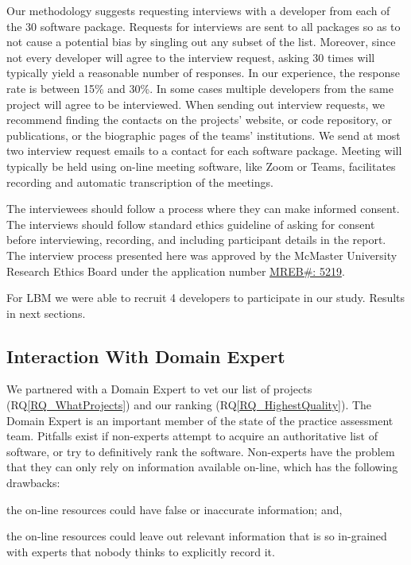 \documentclass[runningheads]{llncs}
\newcommand{\rqref}[1]{RQ\ref{#1}}
\begin{document}
Our methodology suggests requesting interviews with a developer from each of the
30 software package.  Requests for interviews are sent to all packages so as to
not cause a potential bias by singling out any subset of the list. Moreover,
since not every developer will agree to the interview request, asking 30 times
will typically yield a reasonable number of responses. In our experience, the
response rate is between 15\% and 30\%.  In some cases multiple developers from
the same project will agree to be interviewed. When sending out interview
requests, we recommend finding the contacts on the projects’ website, or code
repository, or publications, or the biographic pages of the teams’ institutions.
We send at most two interview request emails to a contact for each software
package.  Meeting will typically be held using on-line meeting software, like
Zoom or Teams, facilitates recording and automatic transcription of the
meetings.

The interviewees should follow a process where they can make informed consent.
The interviews should follow standard ethics guideline of asking for consent
before interviewing, recording, and including participant details in the report.
The interview process presented here was approved by the McMaster University
Research Ethics Board under the application number 
\href{https://github.com/smiths/AIMSS/blob/master/StateOfPractice/MACREM/Application.pdf}
{MREB\#: 5219}.

For LBM we were able to recruit 4 developers to participate in our study.
Results in next sections.

\subsection{Interaction With Domain Expert} \label{sec_vet_software_list}

We partnered with a Domain Expert to vet our list of projects
(\rqref{RQ_WhatProjects}) and our ranking (\rqref{RQ_HighestQuality}).  The
Domain Expert is an important member of the state of the practice assessment
team. Pitfalls exist if non-experts attempt to acquire an authoritative list of
software, or try to definitively rank the software. Non-experts have the problem
that they can only rely on information available on-line, which has the
following drawbacks:
\begin{inparaenum}[i)]
  \item the on-line resources could have false or inaccurate information; and,
  \item the on-line resources could leave out relevant information that is so
in-grained with experts that nobody thinks to explicitly record it.
\end{inparaenum}
\end{document}
